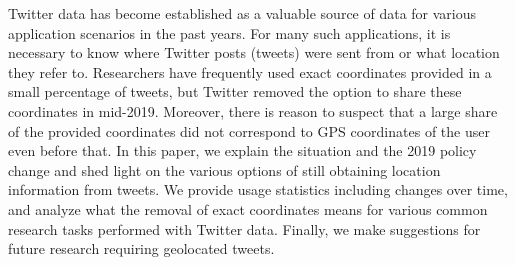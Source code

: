Twitter data has become established as a valuable source of data for various application scenarios in the past years. For many such applications, it is necessary to know where Twitter posts (tweets) were sent from or what location they refer to. Researchers have frequently used exact coordinates provided in a small percentage of tweets, but Twitter removed the option to share these coordinates in mid-2019. Moreover, there is reason to suspect that a large share of the provided coordinates did not correspond to GPS coordinates of the user even before that. In this paper, we explain the situation and the 2019 policy change and shed light on the various options of still obtaining location information from tweets. We provide usage statistics including changes over time, and analyze what the removal of exact coordinates means for various common research tasks performed with Twitter data. Finally, we make suggestions for future research requiring geolocated tweets.
